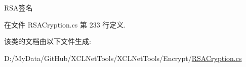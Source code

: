 R\+S\+A签名 



在文件 R\+S\+A\+Cryption.\+cs 第 233 行定义.



该类的文档由以下文件生成\+:\begin{DoxyCompactItemize}
\item 
D\+:/\+My\+Data/\+Git\+Hub/\+X\+C\+L\+Net\+Tools/\+X\+C\+L\+Net\+Tools/\+Encrypt/\hyperlink{_r_s_a_cryption_8cs}{R\+S\+A\+Cryption.\+cs}\end{DoxyCompactItemize}
